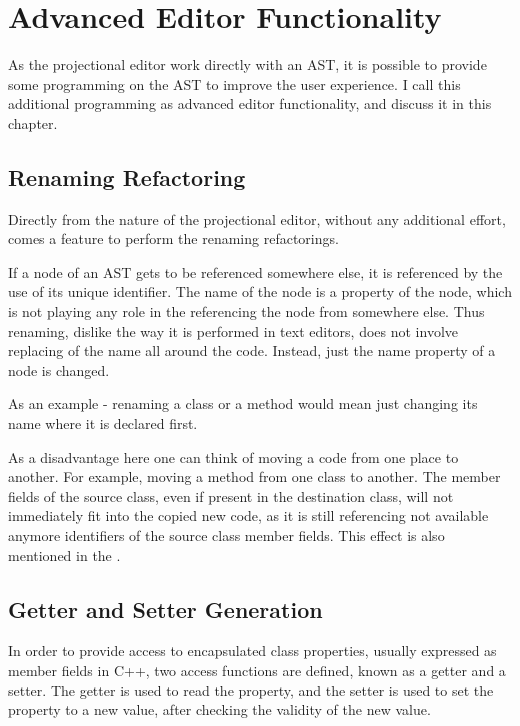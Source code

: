 \chapter{Advanced Editor Functionality}

As the projectional editor work directly with an  AST, it is possible to provide some programming on the AST
to improve the user experience. I call this additional programming as advanced editor functionality, and 
discuss it in this chapter.

\section{Renaming Refactoring}
Directly from the nature of the projectional editor, without any additional effort, comes a feature to 
perform the renaming refactorings.

If a node of an AST gets to be referenced somewhere else, it is referenced by the use of its unique
identifier. The name of the node is a property of the node, which is not playing any role in the
referencing the node from somewhere else. Thus renaming, dislike the way it is performed in text
editors, does not involve replacing of the name all around the code. Instead, just the name property 
of a node is changed.

As an example - renaming a class or a method would mean just changing its name where it is declared first.

As a disadvantage here one can think of moving a code from one place to another. For example, moving 
a method from one class to another. The member fields of the source class, even if present in the destination
class, will not immediately fit into the copied new code, as it is still referencing not available anymore
identifiers of the source class member fields. This effect is also mentioned in the .


\section{Getter and Setter Generation}
\label{section:getterandsetter}

In order to provide access to encapsulated class properties, usually expressed as member fields in C++, 
two access functions are defined, known as a getter and a setter. The getter is used to read the property,
and the setter is used to set the property to a new value, after checking the validity of the new value.


